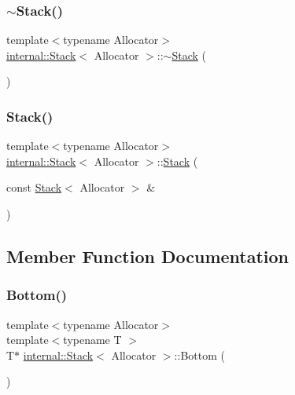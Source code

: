 \subsubsection{\texorpdfstring{$\sim$\+Stack()}{~Stack()}}
{\footnotesize\ttfamily template$<$typename Allocator$>$ \\
\hyperlink{classinternal_1_1Stack}{internal\+::\+Stack}$<$ Allocator $>$\+::$\sim$\hyperlink{classinternal_1_1Stack}{Stack} (\begin{DoxyParamCaption}{ }\end{DoxyParamCaption})\hspace{0.3cm}{\ttfamily [inline]}}

\mbox{\label{classinternal_1_1Stack_af4109a9e632f85f70ac01c69d3ccdb3b}} 
\subsubsection{\texorpdfstring{Stack()}{Stack()}\hspace{0.1cm}{\footnotesize\ttfamily [2/2]}}
{\footnotesize\ttfamily template$<$typename Allocator$>$ \\
\hyperlink{classinternal_1_1Stack}{internal\+::\+Stack}$<$ Allocator $>$\+::\hyperlink{classinternal_1_1Stack}{Stack} (\begin{DoxyParamCaption}\item[{const \hyperlink{classinternal_1_1Stack}{Stack}$<$ Allocator $>$ \&}]{ }\end{DoxyParamCaption})\hspace{0.3cm}{\ttfamily [private]}}



\subsection{Member Function Documentation}
\mbox{\label{classinternal_1_1Stack_a10aa1bc716b82cb0a40b3a3b9d5efe87}} 
\subsubsection{\texorpdfstring{Bottom()}{Bottom()}\hspace{0.1cm}{\footnotesize\ttfamily [1/2]}}
{\footnotesize\ttfamily template$<$typename Allocator$>$ \\
template$<$typename T $>$ \\
T$\ast$ \hyperlink{classinternal_1_1Stack}{internal\+::\+Stack}$<$ Allocator $>$\+::Bottom (\begin{DoxyParamCaption}{ }\end{DoxyParamCaption})\hspace{0.3cm}{\ttfamily [inline]}}

